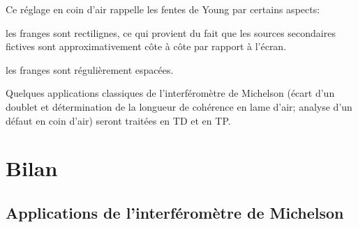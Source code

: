 \documentclass[12pt,fancy]{cours}
\begin{document}
Ce réglage en coin d'air rappelle les fentes de Young par certains aspects:
\begin{liste}
\item les franges sont rectilignes, ce qui provient du fait que les sources secondaires fictives sont approximativement côte à côte par rapport à l'écran.
\item les franges sont régulièrement espacées.
\end{liste}
%
\medskip
Quelques applications classiques de l'interféromètre de Michelson (écart d'un doublet et détermination de la longueur de cohérence en lame d'air; analyse d'un défaut en coin d'air) seront traitées en TD et en TP.



\section{Bilan}
\subsection{Applications de l'interféromètre de Michelson}


\end{document}
